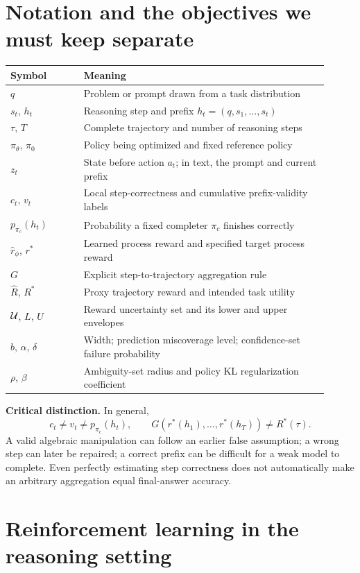\section{Notation and the objectives we must keep separate}
\begin{longtable}{p{0.21\linewidth}p{0.70\linewidth}}
\toprule Symbol & Meaning \\
\midrule\endhead
$q$ & Problem or prompt drawn from a task distribution \\
$s_t$, $h_t$ & Reasoning step and prefix $h_t=(q,s_1,\ldots,s_t)$ \\
$\tau$, $T$ & Complete trajectory and number of reasoning steps \\
$\pi_\theta$, $\pi_0$ & Policy being optimized and fixed reference policy \\
$z_t$ & State before action $a_t$; in text, the prompt and current prefix \\
$c_t$, $v_t$ & Local step-correctness and cumulative prefix-validity labels \\
$p_{\pi_c}(h_t)$ & Probability a fixed completer $\pi_c$ finishes correctly \\
$\hat r_\phi$, $r^*$ & Learned process reward and specified target process reward \\
$G$ & Explicit step-to-trajectory aggregation rule \\
$\hat R$, $R^*$ & Proxy trajectory reward and intended task utility \\
$\mathcal{U}$, $L$, $U$ & Reward uncertainty set and its lower and upper envelopes \\
$b$, $\alpha$, $\delta$ & Width; prediction miscoverage level; confidence-set failure probability \\
$\rho$, $\beta$ & Ambiguity-set radius and policy KL regularization coefficient \\
\bottomrule
\end{longtable}

\textbf{Critical distinction.} In general,
\[
 c_t\ne v_t\ne p_{\pi_c}(h_t),\qquad
 G(r^*(h_1),\ldots,r^*(h_T))\ne R^*(\tau).
\]
A valid algebraic manipulation can follow an earlier false assumption; a wrong
step can later be repaired; a correct prefix can be difficult for a weak model
to complete. Even perfectly estimating step correctness does not automatically
make an arbitrary aggregation equal final-answer accuracy.

\section{Reinforcement learning in the reasoning setting}
